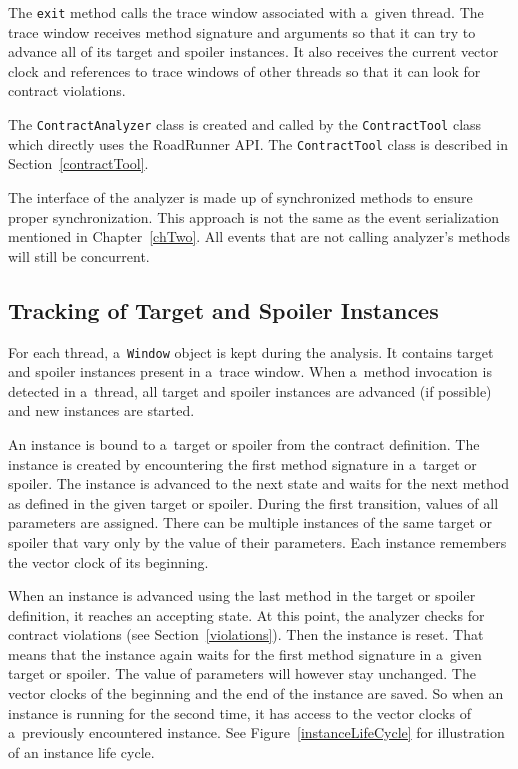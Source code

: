 The \texttt{exit} method calls the trace window associated with a~given thread.
The trace window receives method signature and arguments so that it can try to
advance all of its target and spoiler instances. It also receives the current
vector clock and references to trace windows of other threads so that it can
look for contract violations.

The \texttt{ContractAnalyzer} class is created and called by the
\texttt{ContractTool} class which directly uses the RoadRunner API. The
\texttt{ContractTool} class is described in Section~\ref{contractTool}.

The interface of the analyzer is made up of synchronized methods to ensure
proper synchronization. This approach is not the same as the event serialization
mentioned in Chapter~\ref{chTwo}. All events that are not calling analyzer's
methods will still be concurrent.

\subsection{Tracking of Target and Spoiler Instances}

For each thread, a~\texttt{Window} object is kept during the analysis. It
contains target and spoiler instances present in a~trace window. When a~method
invocation is detected in a~thread, all target and spoiler instances are
advanced (if possible) and new instances are started.

An instance is bound to a~target or spoiler from the contract definition. The
instance is created by encountering the first method signature in a~target or
spoiler. The instance is advanced to the next state and waits for the next
method as defined in the given target or spoiler. During the first transition,
values of all parameters are assigned. There can be multiple instances of the
same target or spoiler that vary only by the value of their parameters. Each
instance remembers the vector clock of its beginning.

When an instance is advanced using the last method in the target or spoiler
definition, it reaches an accepting state. At this point, the analyzer checks
for contract violations (see Section~\ref{violations}). Then the instance is
reset. That means that the instance again waits for the first method signature
in a~given target or spoiler. The value of parameters will however stay
unchanged. The vector clocks of the beginning and the end of the instance are
saved. So when an instance is running for the second time, it has access to the
vector clocks of a~previously encountered instance. See
Figure~\ref{instanceLifeCycle} for illustration of an instance life cycle.

